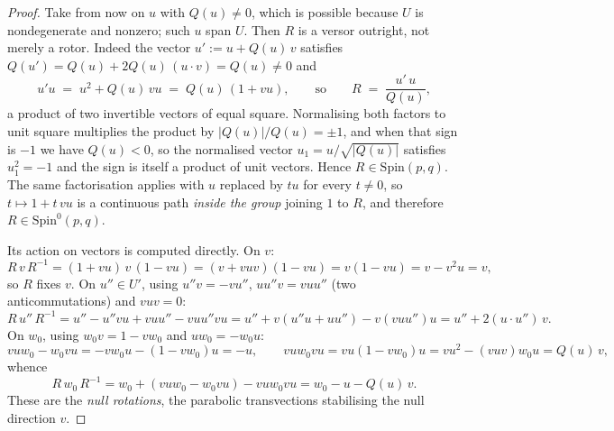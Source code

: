\documentclass[11pt]{article}
\theoremstyle{definition}
\theoremstyle{plain}
\providecommand{\Spin}{}\renewcommand{\Spin}{\mathrm{Spin}}
\begin{document}
\begin{proof}
Take from now on $u$ with $Q(u) \neq 0$, which is possible because $U$ is nondegenerate and nonzero; such $u$ span $U$. Then $R$ is a versor outright, not merely a rotor. Indeed the vector $u' \mathrel{:=} u + Q(u)\,v$ satisfies $Q(u') = Q(u) + 2Q(u)\,(u \cdot v) = Q(u) \neq 0$ and
\begin{equation}\label{eq:versorfactor}
u'u \;=\; u^2 + Q(u)\,vu \;=\; Q(u)\,(1 + vu), \qquad \text{so} \qquad R \;=\; \frac{u'\,u}{Q(u)},
\end{equation}
a product of two invertible vectors of equal square. Normalising both factors to unit square multiplies the product by $|Q(u)|/Q(u) = \pm 1$, and when that sign is $-1$ we have $Q(u) < 0$, so the normalised vector $u_{1} = u/\sqrt{|Q(u)|}$ satisfies $u_{1}^2 = -1$ and the sign is itself a product of unit vectors. Hence $R \in \Spin(p,q)$. The same factorisation applies with $u$ replaced by $tu$ for every $t \neq 0$, so $t \mapsto 1 + t\,vu$ is a continuous path \emph{inside the group} joining $1$ to $R$, and therefore $R \in \Spin^0(p,q)$.

Its action on vectors is computed directly. On $v$:
\[
R\,v\,R^{-1} = (1 + vu)\,v\,(1 - vu) = (v + vuv)(1 - vu) = v(1 - vu) = v - v^2u = v ,
\]
so $R$ fixes $v$. On $u'' \in U'$, using $u''v = -vu''$, $u u'' v = v u u''$ (two anticommutations) and $vuv = 0$:
\[
R\,u''\,R^{-1} = u'' - u''vu + vuu'' - vuu''vu = u'' + v(u''u + uu'') - v(vuu'')u = u'' + 2(u \cdot u'')\,v .
\]
On $w_0$, using $w_0 v = 1 - v w_0$ and $u w_0 = -w_0 u$:
\[
vuw_0 - w_0vu = -vw_0u - (1 - vw_0)u = -u, \qquad
vuw_0vu = vu(1 - vw_0)u = vu^2 - (vuv)w_0u = Q(u)\,v,
\]
whence
\[
R\,w_0\,R^{-1} = w_0 + (vuw_0 - w_0vu) - vuw_0vu = w_0 - u - Q(u)\,v .
\]
These are the \emph{null rotations}, the parabolic transvections stabilising the null direction $v$.


\end{proof}
\end{document}
